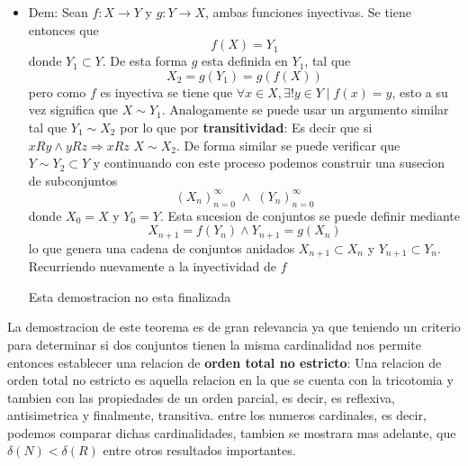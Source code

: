 \begin{itemize}
$$
Si\;\;x \in X_1\;\Rightarrow h(x)=g^{-1}(x)
$$
y procedemos a probar que dicha funcion es una biyeccion entre  $X$ y  $Y$. Para ello, notemos que dicha funcion es inyectiva por la definicion de  $f$ y  $g$, puesto que cada elemento de  $X_1$ esta relacionado a un unico elementto  $y \in Y$ puesto que  $f$ es por deficion inyectiva. De manera analoga ocurre con  $g$. Luego  $h$ es inyectiva.
Ahora, para probar que  $h$ es     \textbf{suprayectiva}: Una funncion  $f:X\to Y$ se dice que es suprayectiva si:
$\forall y \in Y;\;\exists x\in X \mid f(x)=y$, podemos notar que todos los elementos de  $Y$ son mapeados puesto que  $\forall\; x \in X\; \exists ! y \in Y$ tal que  $f(x) = y$, por otro lado, por la definicion de  $h$ tenemos que todos los elementos de  $f$ tambien son mapeados por  $h$, de igual forma ocurre con los elementos de  $g$. Por lo que  $h$ es suprayectiva.
$\therefore \; h$ es una biyeccion y tenemos entonces que  $X \sim Y$
\item Dem: Sean  $f:X \to Y$ y  $g:Y \to X$, ambas funciones inyectivas. Se tiene entonces que
$$
f(X) = Y_1
$$
donde  $Y_1 \subset Y$. De esta forma  $g$ esta definida en  $Y_1$, tal que
$$
X_2 = g(Y_1) = g(f(X))
$$
pero como  $f$ es inyectiva se tiene que  $\forall x \in X, \exists ! y \in Y \mid f(x)=y$, esto a su vez significa que  $X \sim Y_1$. Analogamente se puede usar un argumento similar tal que  $Y_1 \sim X_2$ por lo que por     \textbf{transitividad}: Es decir que si
$xRy \wedge yRz \Rightarrow xRz$ $X \sim X_2$. De forma similar se puede verificar que  $Y \sim Y_2 \subset Y$ y continuando con este proceso podemos construir una susecion de subconjuntos
$$
(X_n)_{n=0}^{\infty} \;\wedge\; (Y_n)_{n=0}^{\infty}
$$
donde  $X_0 = X$ y  $Y_0 = Y$. Esta sucesion de conjuntos se puede definir mediante
$$
X_{n+1} = f(Y_n) \wedge Y_{n+1} = g(X_n)
$$
lo que genera una cadena de conjuntos anidados  $X_{n+1} \subset X_n$ y  $Y_{n+1} \subset Y_n$.
Recurriendo nuevamente a la inyectividad de  $f$\begin{alert}
Esta demostracion no esta finalizada\end{alert}

\end{itemize}
La demostracion de este teorema es de gran relevancia ya que teniendo un criterio para determinar si dos conjuntos tienen la misma cardinalidad nos permite entonces establecer una relacion de  \textbf{orden total no estricto}: Una relacion de orden total no estricto es aquella relacion en la que se cuenta con la tricotomia y tambien con las propiedades de un orden parcial, es decir, es reflexiva, antisimetrica y finalmente, transitiva. entre los numeros cardinales, es decir, podemos comparar dichas cardinalidades, tambien se mostrara mas adelante, que  $\delta(N) < \delta(R)$ entre otros resultados importantes.